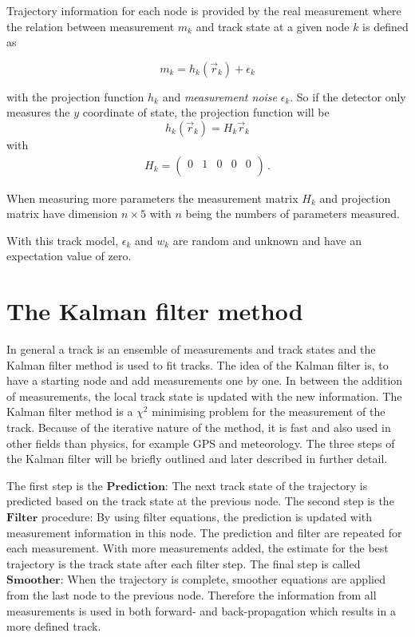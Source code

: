 Trajectory information for each node is provided by the real measurement where the relation between measurement $m_k$ and track state at a given node $k$ is defined as

\begin{equation*}
  m_k = h_k(\vec{r}_k) + \epsilon_k
\end{equation*}

with the projection function $h_k$ and \textit{measurement noise} $\epsilon_k$.
So if the detector only measures the $y$ coordinate of state, the projection function
will be
\begin{equation*}
  h_k(\vec{r}_k) = H_k \vec{r}_k
\end{equation*}
with
\begin{gather*}
  H_k = \begin{pmatrix}
    0 & 1 & 0 & 0 & 0 \\
  \end{pmatrix}\,.
\end{gather*}

When measuring more parameters the measurement matrix $H_k$ and projection matrix have dimension $n\times5$ with $n$ being the numbers of parameters measured.

With this track model, $\epsilon_k$ and $w_k$ are random and unknown and have an expectation value of zero.

\section{The Kalman filter method}
In general a track is an ensemble of measurements and track states and the Kalman filter method\cite{VanTilburg} is used to fit tracks.
The idea of the Kalman filter is, to have a starting node and add measurements one by one. In between the addition of measurements, the local track state is updated with the new information.
The Kalman filter method is a $\chi^2$ minimising problem for the measurement of the track. Because of the iterative nature of the method, it is fast and also used in other fields than physics, for example GPS and meteorology.
The three steps of the Kalman filter will be briefly outlined and later described in further detail.

The first step is the $\symbf{Prediction}$: The next track state of the trajectory is predicted based on the track state at the previous node.
The second step is the $\symbf{Filter}$ procedure: By using filter equations, the prediction is updated with measurement information in this node. The prediction and filter are repeated for each measurement. With more measurements added, the estimate for the best trajectory is the track state after each filter step.
The final step is called $\symbf{Smoother}$: When the trajectory is complete, smoother equations are applied from the last node to the previous node. Therefore the information from all measurements is used in both forward- and back-propagation which results in a more
defined track.

